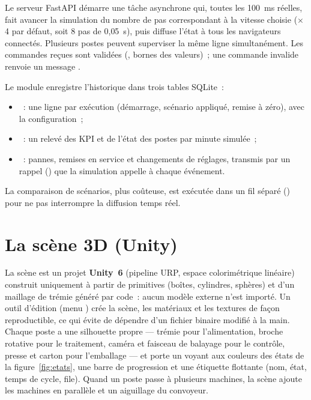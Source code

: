 Le serveur FastAPI démarre une tâche asynchrone qui, toutes les 100~ms réelles, fait avancer la simulation du nombre de pas correspondant à la vitesse choisie ($\times$4 par défaut, soit 8 pas de 0{,}05~s), puis diffuse l'état à tous les navigateurs connectés. Plusieurs postes peuvent superviser la même ligne simultanément. Les commandes reçues sont validées (, bornes des valeurs)~; une commande invalide renvoie un message .

Le module  enregistre l'historique dans trois tables SQLite~:
\begin{itemize}
  \item {}~: une ligne par exécution (démarrage, scénario appliqué, remise à zéro), avec la configuration~;
  \item {}~: un relevé des \ac{KPI} et de l'état des postes par minute simulée~;
  \item {}~: pannes, remises en service et changements de réglages, transmis par un rappel () que la simulation appelle à chaque événement.
\end{itemize}
La comparaison de scénarios, plus coûteuse, est exécutée dans un fil séparé () pour ne pas interrompre la diffusion temps réel.

\section{La scène 3D (Unity)}

La scène est un projet \textbf{Unity~6} (pipeline URP, espace colorimétrique linéaire) construit uniquement à partir de primitives (boîtes, cylindres, sphères) et d'un maillage de trémie généré par code~: aucun modèle externe n'est importé. Un outil d'édition (menu ) crée la scène, les matériaux et les textures de façon reproductible, ce qui évite de dépendre d'un fichier binaire modifié à la main. Chaque poste a une silhouette propre --- trémie pour l'alimentation, broche rotative pour le traitement, caméra et faisceau de balayage pour le contrôle, presse et carton pour l'emballage --- et porte un voyant aux couleurs des états de la figure~\ref{fig:etats}, une barre de progression et une étiquette flottante (nom, état, temps de cycle, file). Quand un poste passe à plusieurs machines, la scène ajoute les machines en parallèle et un aiguillage du convoyeur.

